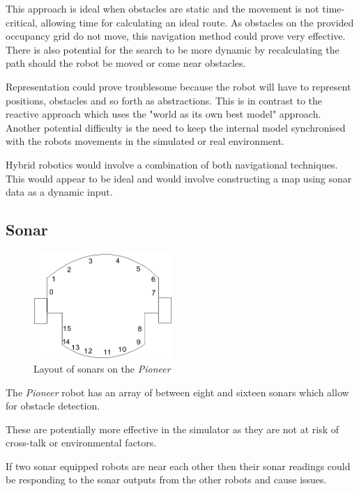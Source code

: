 \documentclass[a4paper,12pt]{article}
\begin{document}
This approach is ideal when obstacles are static and the movement is not time-critical, allowing time for calculating an ideal route. As obstacles on the provided occupancy grid do not move, this navigation method could prove very effective. There is also potential for the search to be more dynamic by recalculating the path should the robot be moved or come near obstacles.

Representation could prove troublesome because the robot will have to represent positions, obstacles and so forth as abstractions. This is in contrast to the reactive approach which uses the "world as its own best model" approach. Another potential difficulty is the need to keep the internal model synchronised with the robots movements in the simulated or real environment.

Hybrid robotics would involve a combination of both navigational techniques. This would appear to be ideal and would involve constructing a map using sonar data as a dynamic input.
\subsection{Sonar}
\begin{figure}
    \begin{center}
            \includegraphics[width=0.47\textwidth]{images/sonars_wiki_dcs_aber_ac_uk.png}
            \caption{Layout of sonars on the \textit{Pioneer} \cite{sonardiagram}}
    \end{center}
\end{figure}

The \textit{Pioneer} robot has an array of between eight and sixteen sonars which allow for obstacle detection.

These are potentially more effective in the simulator as they are not at risk of cross-talk or environmental factors. 

If two sonar equipped robots are near each other then their sonar readings could be responding to the sonar outputs from the other robots and cause issues.
\end{document}
